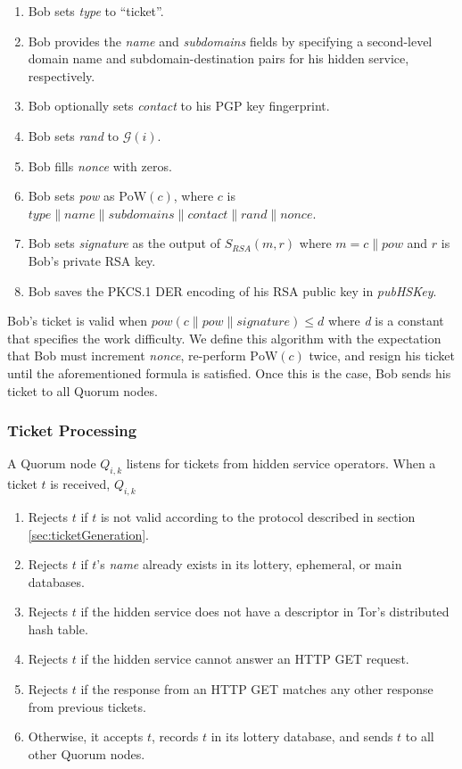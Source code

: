 \documentclass[USenglish,oneside,twocolumn]{article}
\newcommand*\concat{\mathbin{\|}}
\begin{document}
\begin{enumerate}
	\item Bob sets \emph{type} to ``ticket''.
	\item Bob provides the \emph{name} and \emph{subdomains} fields by specifying a second-level domain name and subdomain-destination pairs for his hidden service, respectively.
	\item Bob optionally sets \emph{contact} to his PGP key fingerprint.
	\item Bob sets \emph{rand} to $ \mathcal{G}(i) $.
	\item Bob fills \emph{nonce} with zeros.
	\item Bob sets \emph{pow} as $ \mathrm{PoW}(\mathit{c}) $, where $ \mathit{c} $ is $ \mathit{type} \concat \mathit{name} \concat \mathit{subdomains} \concat \mathit{contact} \concat \mathit{rand} \concat \mathit{nonce} $.
	\item Bob sets \emph{signature} as the output of $ S_{\mathit{RSA}}(m, r) $ where $ m = \mathit{c} \concat \mathit{pow} $ and $ r $ is Bob's private RSA key.
	\item Bob saves the PKCS.1 DER encoding of his RSA public key in \emph{pubHSKey}.
\end{enumerate}

Bob's ticket is valid when $ \mathit{pow}(\mathit{c} \concat \mathit{pow} \concat \mathit{signature}) \leq d $ where \emph{d} is a constant that specifies the work difficulty. We define this algorithm with the expectation that Bob must increment \emph{nonce}, re-perform $ \mathrm{PoW}(\mathit{c}) $ twice, and resign his ticket until the aforementioned formula is satisfied. Once this is the case, Bob sends his ticket to all Quorum nodes.

\subsubsection{Ticket Processing} %

A Quorum node $ Q_{i,k} $ listens for tickets from hidden service operators. When a ticket $ t $ is received, $ Q_{i,k} $

\begin{enumerate}
	\item Rejects $ t $ if $ t $ is not valid according to the protocol described in section \ref{sec:ticketGeneration}.
	\item Rejects $ t $ if $ t $'s \emph{name} already exists in its lottery, ephemeral, or main databases.
	\item Rejects $ t $ if the hidden service does not have a descriptor in Tor's distributed hash table.
	\item Rejects $ t $ if the hidden service cannot answer an HTTP GET request.
	\item Rejects $ t $ if the response from an HTTP GET matches any other response from previous tickets.
	\item Otherwise, it accepts $ t $, records $ t $ in its lottery database, and sends $ t $ to all other Quorum nodes.
\end{enumerate}
\end{document}

